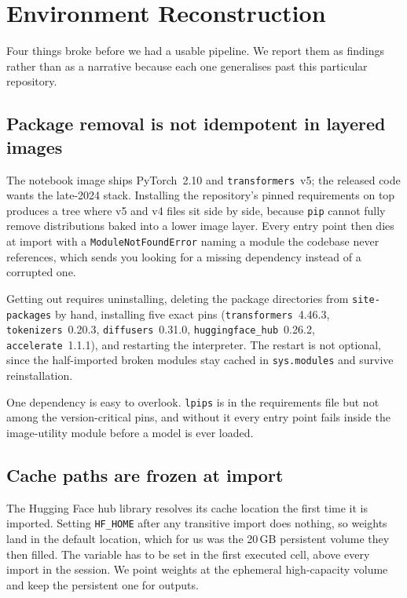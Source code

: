 \documentclass[10pt,twocolumn]{article}
\newcommand{\code}[1]{\texttt{\small #1}}
\begin{document}
\section{Environment Reconstruction}
\label{sec:env}

Four things broke before we had a usable pipeline. We report them as findings rather than as a
narrative because each one generalises past this particular repository.

\subsection{Package removal is not idempotent in layered images}

The notebook image ships PyTorch~2.10 and \code{transformers}~v5; the released code
wants the late-2024 stack. Installing the repository's pinned requirements on top
produces a tree where v5 and v4 files sit side by side, because \code{pip} cannot
fully remove distributions baked into a lower image layer. Every entry point then dies
at import with a \code{ModuleNotFoundError} naming a module the codebase never
references, which sends you looking for a missing dependency instead of a corrupted
one.

Getting out requires uninstalling, deleting the package directories from
\code{site-packages} by hand, installing five exact pins
(\code{transformers}~4.46.3, \code{tokenizers}~0.20.3, \code{diffusers}~0.31.0,
\code{huggingface\_hub}~0.26.2, \code{accelerate}~1.1.1), and restarting the
interpreter. The restart is not optional, since the half-imported broken modules stay
cached in \code{sys.modules} and survive reinstallation.

One dependency is easy to overlook. \code{lpips} is in the requirements file but not
among the version-critical pins, and without it every entry point fails inside the
image-utility module before a model is ever loaded.

\subsection{Cache paths are frozen at import}

The Hugging Face hub library resolves its cache location the first time it is
imported. Setting \code{HF\_HOME} after any transitive import does nothing, so weights
land in the default location, which for us was the 20\,GB persistent volume they then
filled. The variable has to be set in the first executed cell, above every import in
the session. We point weights at the ephemeral high-capacity volume and keep the
persistent one for outputs.
\end{document}
